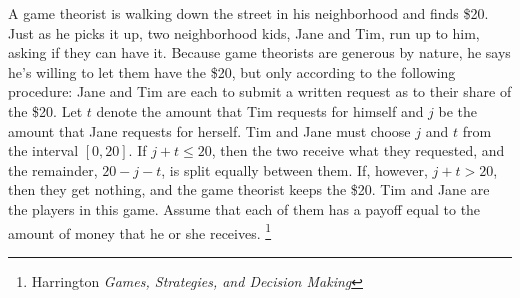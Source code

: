 \documentclass[addpoints]{exam}
\begin{document}
\begin{questions}
\question
A game theorist is walking down the street in his neighborhood and finds \$20.
Just as he picks it up, two neighborhood kids, 
Jane and Tim,
run up to him, asking if they can have it.
Because game theorists are generous by nature, 
he says he's willing to let them have the \$20,
but only according to the following procedure:
Jane and Tim are each to submit a written request 
as to their share of the \$20. 
Let $t$ denote the amount that Tim requests for himself
and $j$ be the amount that Jane requests for herself.
Tim and Jane must choose $j$ and $t$ from the interval
$[0,20]$.
If $j + t \leq 20$, then the two receive what they requested,
and the remainder, $20 - j - t$, is split equally between them.
If, however, $j + t > 20$, then they get nothing, and the game theorist keeps the \$20.
Tim and Jane are the players in this game.
Assume that each of them has a payoff equal to the amount of money that he or she receives. 
\footnote{Harrington \textit{Games, Strategies, and Decision Making}}

\end{questions}
\end{document}
